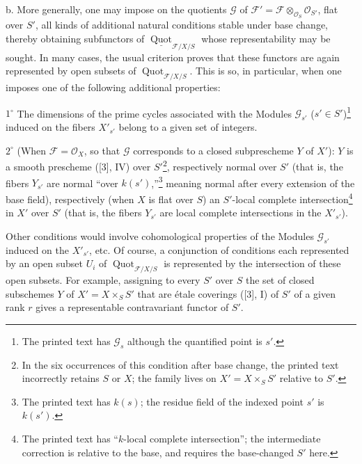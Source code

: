 \medskip
\noindent b. More generally, one may impose on the quotients $\mathcal G$ of
$\mathcal F'=\mathcal F\otimes_{\mathcal O_S}\mathcal O_{S'}$, flat over $S'$,
all kinds of additional natural conditions stable under base change, thereby
obtaining subfunctors of
$\underline{\operatorname{Quot}}_{\mathcal F/X/S}$ whose representability may
be sought. In many cases, the usual criterion proves that these functors are
again represented by open subsets of
$\operatorname{Quot}_{\mathcal F/X/S}$. This is so, in particular, when one
imposes one of the following additional properties:

\smallskip
\noindent $1^\circ$ The dimensions of the prime cycles associated with the
Modules $\mathcal G_{s'}$ ($s'\in S'$)\footnote{The printed text has $\mathcal G_s$ although the quantified point is $s'$.} induced on the fibers $X'_{s'}$ belong
to a given set of integers.

\smallskip
\noindent $2^\circ$ (When $\mathcal F=\mathcal O_X$, so that $\mathcal G$
corresponds to a closed subprescheme $Y$ of $X'$): $Y$ is a smooth prescheme
([3], IV) over $S'$\footnote{In the six occurrences of this condition after base change, the printed text incorrectly retains $S$ or $X$; the family lives on $X'=X\times_SS'$ relative to $S'$.}, respectively normal over $S'$ (that is, the fibers $Y_{s'}$
are normal “over $k(s')$,”\footnote{The printed text has $k(s)$; the residue field of the indexed point $s'$ is $k(s')$.} meaning normal after every extension of the base
field), respectively (when $X$ is flat over $S$) an $S'$-local complete
intersection\footnote{The printed text has “$k$-local complete intersection”; the intermediate correction is relative to the base, and requires the base-changed $S'$ here.} in $X'$ over $S'$ (that is, the fibers $Y_{s'}$ are local complete
intersections in the $X'_{s'}$).

Other conditions would involve cohomological properties of the Modules
$\mathcal G_{s'}$ induced on the $X'_{s'}$, etc. Of course, a conjunction of
conditions each represented by an open subset $U_i$ of
$\operatorname{Quot}_{\mathcal F/X/S}$ is represented by the intersection of
these open subsets. For example, assigning to every $S'$ over $S$ the set of
closed subschemes $Y$ of $X'=X\times_SS'$ that are étale coverings ([3], I) of
$S'$ of a given rank $r$ gives a representable contravariant functor of $S'$.

